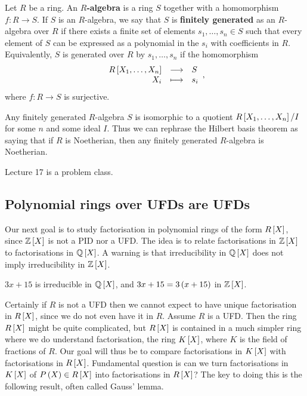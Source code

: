 \begin{definition}
Let $ R $ be a ring. An \textbf{$ R $-algebra} is a ring $ S $ together with a homomorphism $ f : R \to S $. If $ S $ is an $ R $-algebra, we say that $ S $ is \textbf{finitely generated} as an $ R $-algebra over $ R $ if there exists a finite set of elements $ s_1, \dots, s_n \in S $ such that every element of $ S $ can be expressed as a polynomial in the $ s_i $ with coefficients in $ R $. Equivalently, $ S $ is generated over $ R $ by $ s_1, \dots, s_n $ if the homomorphism
$$ \function{R\sbr{X_1, \dots, X_n}}{S}{X_i}{s_i}, $$
where $ f : R \to S $ is surjective.
\end{definition}

\begin{note*}
Any finitely generated $ R $-algebra $ S $ is isomorphic to a quotient $ R\sbr{X_1, \dots, X_n} / I $ for some $ n $ and some ideal $ I $. Thus we can rephrase the Hilbert basis theorem as saying that if $ R $ is Noetherian, then any finitely generated $ R $-algebra is Noetherian.
\end{note*}


Lecture 17 is a problem class.

\pagebreak

\subsection{Polynomial rings over UFDs are UFDs}


Our next goal is to study factorisation in polynomial rings of the form $ R\sbr{X} $, since $ \Z\sbr{X} $ is not a PID nor a UFD. The idea is to relate factorisations in $ \Z\sbr{X} $ to factorisations in $ \Q\sbr{X} $. A warning is that irreducibility in $ \Q\sbr{X} $ does not imply irreducibility in $ \Z\sbr{X} $.

\begin{example*}
$ 3x + 15 $ is irreducible in $ \Q\sbr{X} $, and $ 3x + 15 = 3\br{x + 15} $ in $ \Z\sbr{X} $.
\end{example*}

Certainly if $ R $ is not a UFD then we cannot expect to have unique factorisation in $ R\sbr{X} $, since we do not even have it in $ R $. Assume $ R $ is a UFD. Then the ring $ R\sbr{X} $ might be quite complicated, but $ R\sbr{X} $ is contained in a much simpler ring where we do understand factorisation, the ring $ K\sbr{X} $, where $ K $ is the field of fractions of $ R $. Our goal will thus be to compare factorisations in $ K\sbr{X} $ with factorisations in $ R\sbr{X} $. Fundamental question is can we turn factorisations in $ K\sbr{X} $ of $ P\br{X} \in R\sbr{X} $ into factorisations in $ R\sbr{X} $? The key to doing this is the following result, often called Gauss' lemma.

